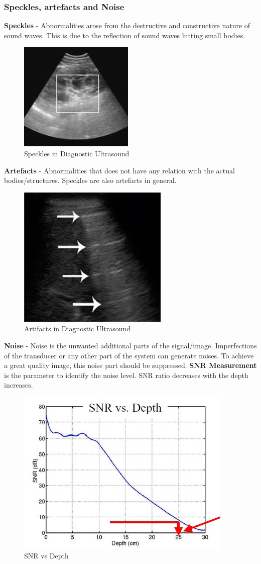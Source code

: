 \documentclass[12pt]{article}
\def \topic{Diagnostic Ultrasound}
\begin{document}
\subsubsection{Speckles, artefacts and Noise}
\textbf{Speckles} - Abnormalities arose from the destructive and constructive nature of sound waves. This is due to the reflection of sound waves hitting small bodies. 
\begin{figure}[!h]
    \centering
    \includegraphics[width=0.25\linewidth]{speckle.jpg}
    \caption{\small{Speckles in \topic}}
    \label{fig:Speckles in US}
\end{figure}

\textbf{Artefacts} - Abnormalities that does not have any relation with the actual bodies/structures. Speckles are also artefacts in general. 
\begin{figure}[!h]
    \centering
    \includegraphics[width=0.25\linewidth]{ar.jpg}
    \caption{\small{Artifacts in \topic}}
    \label{fig:Speckles in US}
\end{figure}
\textbf{Noise} - Noise is the unwanted additional parts of the signal/image. Imperfections of the transducer or any other part of the system can generate noises. To achieve a great quality image, this noise part should be suppressed. \textbf{SNR Measurement} is the parameter to identify the noise level. SNR ratio decreases with the depth increases. 
\begin{figure}[!h]
    \centering
    \includegraphics[width=0.3\linewidth]{snr.jpg}
    \caption{\small{SNR vs Depth}}
    \label{fig:SNR vs Depth}
\end{figure}
\end{document}
